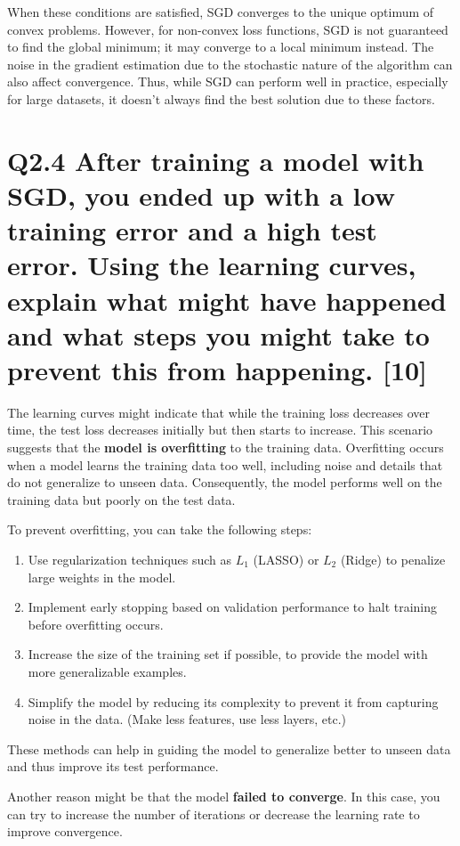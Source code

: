 \documentclass[11pt]{article}
\begin{document}
When these conditions are satisfied, SGD converges to the unique optimum of convex problems. However, for non-convex loss functions, SGD is not guaranteed to find the global minimum; it may converge to a local minimum instead. The noise in the gradient estimation due to the stochastic nature of the algorithm can also affect convergence. Thus, while SGD can perform well in practice, especially for large datasets, it doesn't always find the best solution due to these factors.

\section{Q2.4 After training a model with SGD, you ended up with a low training error and a high test error. Using the learning curves, explain what might have happened and what steps you might take to prevent this from happening. [10]}

The learning curves might indicate that while the training loss decreases over time, the test loss decreases initially but then starts to increase. This scenario suggests that the \textbf{model is overfitting} to the training data. Overfitting occurs when a model learns the training data too well, including noise and details that do not generalize to unseen data. Consequently, the model performs well on the training data but poorly on the test data.

To prevent overfitting, you can take the following steps:
\begin{enumerate}
    \item Use regularization techniques such as \( L_1 \) (LASSO) or \( L_2 \) (Ridge) to penalize large weights in the model.
    \item Implement early stopping based on validation performance to halt training before overfitting occurs.
    \item Increase the size of the training set if possible, to provide the model with more generalizable examples.
    \item Simplify the model by reducing its complexity to prevent it from capturing noise in the data. (Make less features, use less layers, etc.)
\end{enumerate}

These methods can help in guiding the model to generalize better to unseen data and thus improve its test performance.

Another reason might be that the model \textbf{failed to converge}. In this case, you can try to increase the number of iterations or decrease the learning rate to improve convergence.
\end{document}
